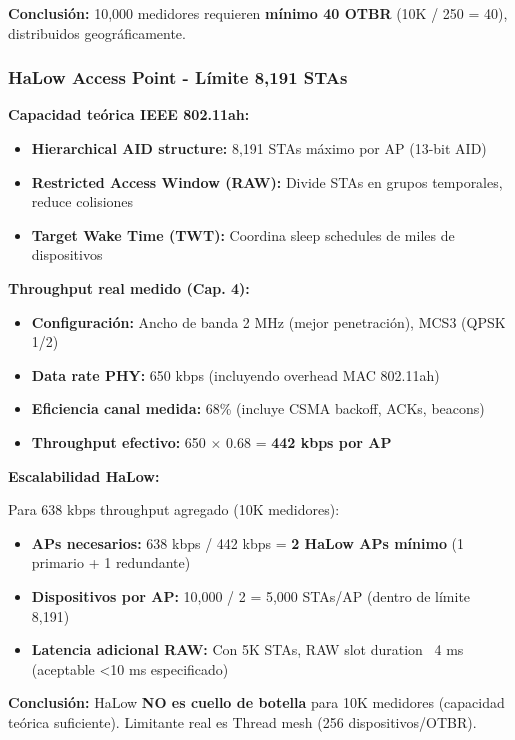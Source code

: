 \textbf{Conclusión:} 10,000 medidores requieren \textbf{mínimo 40 OTBR} (10K / 250 = 40), distribuidos geográficamente.

\subsubsection{HaLow Access Point - Límite 8,191 STAs}

\textbf{Capacidad teórica IEEE 802.11ah:}

\begin{itemize}
\item \textbf{Hierarchical AID structure:} 8,191 STAs máximo por AP (13-bit AID)~\cite{ieee80211ah2020}
\item \textbf{Restricted Access Window (RAW):} Divide STAs en grupos temporales, reduce colisiones
\item \textbf{Target Wake Time (TWT):} Coordina sleep schedules de miles de dispositivos
\end{itemize}

\textbf{Throughput real medido (Cap. 4):}

\begin{itemize}
\item \textbf{Configuración:} Ancho de banda 2 MHz (mejor penetración), MCS3 (QPSK 1/2)
\item \textbf{Data rate PHY:} 650 kbps (incluyendo overhead MAC 802.11ah)
\item \textbf{Eficiencia canal medida:} 68\% (incluye CSMA backoff, ACKs, beacons)
\item \textbf{Throughput efectivo:} 650 $\times$ 0.68 = \textbf{442 kbps por AP}
\end{itemize}

\textbf{Escalabilidad HaLow:}

Para 638 kbps throughput agregado (10K medidores):
\begin{itemize}
\item \textbf{APs necesarios:} 638 kbps / 442 kbps = \textbf{2 HaLow APs mínimo} (1 primario + 1 redundante)
\item \textbf{Dispositivos por AP:} 10,000 / 2 = 5,000 STAs/AP (dentro de límite 8,191)
\item \textbf{Latencia adicional RAW:} Con 5K STAs, RAW slot duration ~4 ms (aceptable <10 ms especificado)
\end{itemize}

\textbf{Conclusión:} HaLow \textbf{NO es cuello de botella} para 10K medidores (capacidad teórica suficiente). Limitante real es Thread mesh (256 dispositivos/OTBR).


